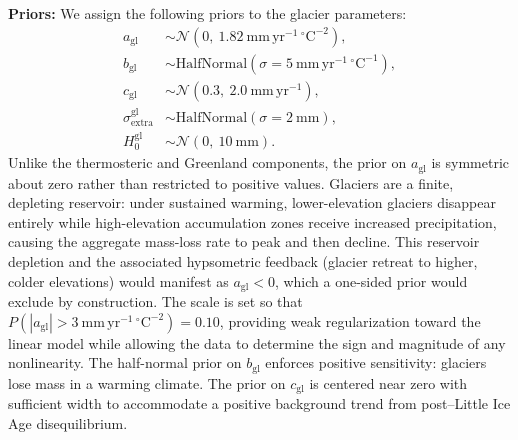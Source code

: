 \documentclass[11pt]{article}
\begin{document}
\textbf{Priors:} We assign the following priors to the glacier parameters:
\begin{align}
	a_{\mathrm{gl}} &\sim \mathcal{N}\!\left(0,\ 1.82\ \mathrm{mm\,yr^{-1}\,{^\circ C}^{-2}}\right), \label{eq:glacier_prior_a} \\
	b_{\mathrm{gl}} &\sim \mathrm{HalfNormal}\!\left(\sigma = 5\ \mathrm{mm\,yr^{-1}\,{^\circ C}^{-1}}\right), \label{eq:glacier_prior_b} \\
	c_{\mathrm{gl}} &\sim \mathcal{N}\!\left(0.3,\ 2.0\ \mathrm{mm\,yr^{-1}}\right), \label{eq:glacier_prior_c} \\
	\sigma_{\mathrm{extra}}^{\mathrm{gl}} &\sim \mathrm{HalfNormal}\!\left(\sigma = 2\ \mathrm{mm}\right), \label{eq:glacier_prior_sigma} \\
	H_0^{\mathrm{gl}} &\sim \mathcal{N}\!\left(0,\ 10\ \mathrm{mm}\right). \label{eq:glacier_prior_H0}
\end{align}
Unlike the thermosteric and Greenland components, the prior on $a_{\mathrm{gl}}$ is symmetric about zero rather than restricted to positive values. Glaciers are a finite, depleting reservoir: under sustained warming, lower-elevation glaciers disappear entirely while high-elevation accumulation zones receive increased precipitation, causing the aggregate mass-loss rate to peak and then decline. This reservoir depletion and the associated hypsometric feedback (glacier retreat to higher, colder elevations) would manifest as $a_{\mathrm{gl}} < 0$, which a one-sided prior would exclude by construction. The scale is set so that $P(|a_{\mathrm{gl}}| > 3\ \mathrm{mm\,yr^{-1}\,{^\circ C}^{-2}}) = 0.10$, providing weak regularization toward the linear model while allowing the data to determine the sign and magnitude of any nonlinearity. The half-normal prior on $b_{\mathrm{gl}}$ enforces positive sensitivity: glaciers lose mass in a warming climate. The prior on $c_{\mathrm{gl}}$ is centered near zero with sufficient width to accommodate a positive background trend from post--Little Ice Age disequilibrium.
\end{document}
